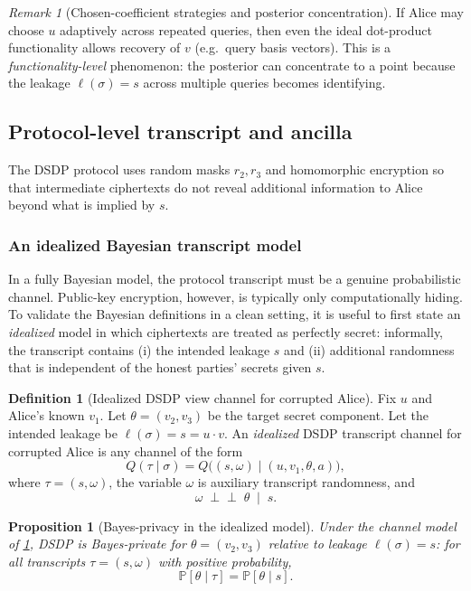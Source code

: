 \documentclass[11pt,a4paper]{article}
\newtheorem{proposition}[theorem]{Proposition}
\theoremstyle{definition}
\newtheorem{definition}[theorem]{Definition}
\theoremstyle{remark}
\newtheorem{remark}[theorem]{Remark}
\newcommand{\Prb}{\mathbb{P}}
\newcommand{\Leak}{\ell}
\begin{document}
\begin{remark}[Chosen-coefficient strategies and posterior concentration]
If Alice may choose \(u\) adaptively across repeated queries, then even the ideal dot-product functionality allows recovery of \(v\) (e.g.\ query basis vectors). This is a \emph{functionality-level} phenomenon: the posterior can concentrate to a point because the leakage \(\Leak(\sigma)=s\) across multiple queries becomes identifying.
\end{remark}

\subsection{Protocol-level transcript and ancilla}
The DSDP protocol uses random masks \(r_2,r_3\) and homomorphic encryption so that intermediate ciphertexts do not reveal additional information to Alice beyond what is implied by \(s\).

\subsubsection{An idealized Bayesian transcript model}
In a fully Bayesian model, the protocol transcript must be a genuine probabilistic channel. Public-key encryption, however, is typically only computationally hiding. To validate the Bayesian definitions in a clean setting, it is useful to first state an \emph{idealized} model in which ciphertexts are treated as perfectly secret: informally, the transcript contains (i) the intended leakage \(s\) and (ii) additional randomness that is independent of the honest parties' secrets given \(s\).

\begin{definition}[Idealized DSDP view channel for corrupted Alice]
\label{def:dsdp-ideal-channel}
Fix \(u\) and Alice's known \(v_1\). Let \(\theta=(v_2,v_3)\) be the target secret component. Let the intended leakage be \(\Leak(\sigma)=s=u\cdot v\).
An \emph{idealized} DSDP transcript channel for corrupted Alice is any channel of the form
\[
Q(\tau\mid\sigma) = Q\bigl((s,\omega)\mid (u,v_1,\theta,a)\bigr),
\]
where \(\tau=(s,\omega)\), the variable \(\omega\) is auxiliary transcript randomness, and
\[
\omega \;\perp\!\!\!\perp\; \theta \;\mid\; s.
\]
\end{definition}

\begin{proposition}[Bayes-privacy in the idealized model]
\label{prop:dsdp-ideal-privacy}
Under the channel model of \cref{def:dsdp-ideal-channel}, DSDP is Bayes-private for \(\theta=(v_2,v_3)\) relative to leakage \(\Leak(\sigma)=s\): for all transcripts \(\tau=(s,\omega)\) with positive probability,
\[
\Prb[\theta\mid \tau] = \Prb[\theta\mid s].
\]
\end{proposition}
\end{document}
